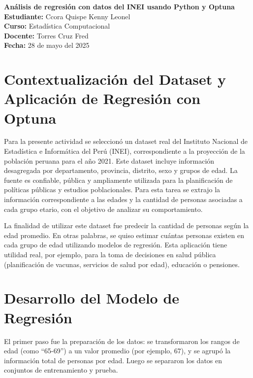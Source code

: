 \documentclass[a4paper,10pt]{article}
\begin{document}
\thispagestyle{fancy}

\begin{center}
    \textbf{\LARGE Análisis de regresión con datos del INEI usando Python y Optuna} \\
    \vspace{0.3cm}
    \textbf{Estudiante:} Ccora Quispe Kenny Leonel \\
    \textbf{Curso:} Estadística Computacional \\
    \textbf{Docente:} Torres Cruz Fred \\
    \textbf{Fecha:} 28 de mayo del 2025
\end{center}

\vspace{0.5cm}

\section*{Contextualización del Dataset y Aplicación de Regresión con Optuna}

Para la presente actividad se seleccionó un dataset real del Instituto Nacional de Estadística e Informática del Perú (INEI), correspondiente a la proyección de la población peruana para el año 2021. Este dataset incluye información desagregada por departamento, provincia, distrito, sexo y grupos de edad. La fuente es confiable, pública y ampliamente utilizada para la planificación de políticas públicas y estudios poblacionales. Para esta tarea se extrajo la información correspondiente a las edades y la cantidad de personas asociadas a cada grupo etario, con el objetivo de analizar su comportamiento.

La finalidad de utilizar este dataset fue predecir la cantidad de personas según la edad promedio. En otras palabras, se quiso estimar cuántas personas existen en cada grupo de edad utilizando modelos de regresión. Esta aplicación tiene utilidad real, por ejemplo, para la toma de decisiones en salud pública (planificación de vacunas, servicios de salud por edad), educación o pensiones.

\section*{Desarrollo del Modelo de Regresión}

El primer paso fue la preparación de los datos: se transformaron los rangos de edad (como ``65-69'') a un valor promedio (por ejemplo, 67), y se agrupó la información total de personas por edad. Luego se separaron los datos en conjuntos de entrenamiento y prueba.
\end{document}
